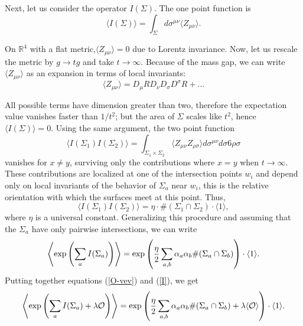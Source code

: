 \documentclass[12pt, onecolumn]{article}
\begin{document}
Next, let us consider the operator $I(\Sigma)$. The one point function is 
\begin{equation}
\langle I(\Sigma) \rangle = \int_\Sigma d \sigma^{\mu \nu} \langle Z_{\mu \nu} \rangle.
\end{equation}

On $\mathbb{R}^4$ with a flat metric,$ \langle Z_{\mu \nu} \rangle = 0 $ due to Lorentz invariance. Now, let us rescale the metric by $g\rightarrow tg$ and take $t\rightarrow \infty$. Because of the mass gap, we can write $ \langle Z_{\mu \nu} \rangle $ as an expansion in terms of local invariants:
\begin{equation}
 \langle Z_{\mu \nu} \rangle = D_\mu R D_\nu D_\sigma D^\sigma R+\ldots 
\end{equation} 

All possible terms have dimension greater than two, therefore the expectation value vanishes faster than $1/t^2$; but the area of $\Sigma$ scales like $t^2$, hence  $\langle I(\Sigma) \rangle =0$. Using the same argument, the two point function 
\begin{equation}
 \langle I(\Sigma_1)I(\Sigma_2) \rangle = \int_{\Sigma_1\times \Sigma_2} \langle Z_{\mu \nu} Z_{\rho \sigma} \rangle d\sigma^{\mu \nu} d\sigma6{\rho \sigma} 
 \end{equation} vanishes for $x \neq y$, surviving only the contributions where $x=y$ when $t\rightarrow\infty$. These contributions are localized at one of the intersection points $w_i$ and depend only on local invariants of the behavior of $\Sigma_a$ near $w_i$, this is the relative orientation with which the surfaces meet at this point. Thus,
\begin{equation} 
 \langle I(\Sigma_1)I(\Sigma_2) \rangle = \eta \cdot \#(\Sigma_1 \cap \Sigma_2 )\cdot \langle 1 \rangle,
\end{equation}
where $\eta$ is a universal constant. Generalizing this procedure and assuming that the $\Sigma_a$ have only pairwise intersections, we can write 
\begin{equation}
 \left\langle {\rm exp} \left(\sum_a I(\Sigma_a)\right) \right\rangle  = {\rm exp} \left( \frac{\eta}{2} \sum_{a,b} \alpha_a \alpha_b \#(\Sigma_a \cap \Sigma_b )\right) \cdot \langle 1 \rangle. \label{I}
\end{equation} 
 Putting together equations (\ref{O-vev}) and (\ref{I}), we get
 \begin{equation}
 \left\langle {\rm exp} \left(\sum_a I(\Sigma_a)+\lambda \mathcal{O}\right) \right\rangle  = {\rm exp} \left( \frac{\eta}{2} \sum_{a,b} \alpha_a \alpha_b \#(\Sigma_a \cap \Sigma_b) + \lambda \langle \mathcal{O} \rangle\right) \cdot \langle 1 \rangle.
\end{equation} 
\end{document}
